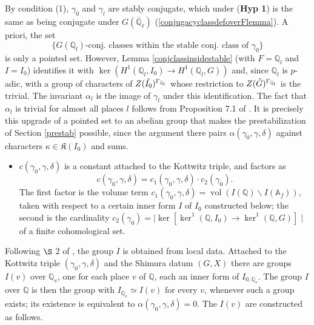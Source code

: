 \documentclass[11pt,a4paper]{article}
\newcommand{\HypOne}{\textbf{Hyp 1}}
\theoremstyle{definition}
\theoremstyle{plain}
\theoremstyle{remark}
\theoremstyle{plain}
\DeclareMathOperator{\vol}{vol}
\begin{document}
By condition (1), $\gamma_0$ and $\gamma_l$ are stably conjugate, which under (\HypOne{}) is the same as being conjugate under $G(\overline{\mathbb{Q}}_\ell)$ (\ref{conjugacyclassdefoverFlemma}). A priori, the set
$$\{ G(\mathbb{Q}_l)\text{-conj. classes within the stable conj. class of }\gamma_0 \}$$
is only a pointed set. However, Lemma \ref{conjclassinsidestable} (with $F = \mathbb{Q}_l$ and $I = I_0$) identifies it with $\ker(H^1(\mathbb{Q}_l, I_0) \to H^1(\mathbb{Q}_l, G))$ and, since $\mathbb{Q}_l$ is $p$-adic, with a group of characters of $Z(\Hat{I_0})^{\Gamma_{\mathbb{Q}_l}}$ whose restriction to $Z(\Hat{G})^{\Gamma_{\mathbb{Q}_l}}$ is the trivial. The invariant $\alpha_l$ is the image of $\gamma_l$ under this identification. The fact that $\alpha_l$ is trivial for almost all places $l$ follows from Proposition 7.1 of \cite{MR858284}. It is precisely this upgrade of a pointed set to an abelian group that makes the prestabilization of Section \ref{prestab} possible, since the argument there pairs $\alpha(\gamma_0,\gamma,\delta)$ against characters $\kappa \in \mathfrak{K}(I_0)$ and sums.

\begin{itemize}
    \item $c(\gamma_0, \gamma, \delta)$ is a constant attached to the Kottwitz triple, and factors as
    $$c(\gamma_0, \gamma, \delta) = c_1 ( \gamma_0, \gamma, \delta) \cdot c_2 (\gamma_0).$$
    The first factor is the volume term $c_1(\gamma_0,\gamma,\delta) = \vol (I(\mathbb{Q}) \backslash I(\mathbb{A}_f))$, taken with respect to a certain inner form $I$ of $I_0$ constructed below; the second is the cardinality $c_2(\gamma_0) = \mid \ker[\ker^1(\mathbb{Q}, I_0) \xrightarrow{} \ker^1(\mathbb{Q}, G)] \mid$ of a finite cohomological set.
\end{itemize}

Following $\S$ 2 of \cite{MR1044820}, the group $I$ is obtained from local data. Attached to the Kottwitz triple $(\gamma_0, \gamma, \delta)$ and the Shimura datum $(G,X)$ there are groups $I(v)$ over $\mathbb{Q}_v$, one for each place $v$ of $\mathbb{Q}$, each an inner form of $I_{0,\mathbb{Q}_v}$. The group $I$ over $\mathbb{Q}$ is then the group with $I_{\mathbb{Q}_v} \simeq I(v)$ for every $v$, whenever such a group exists; its existence is equivalent to $\alpha(\gamma_0, \gamma, \delta) = 0$. The $I(v)$ are constructed as follows.
\end{document}
